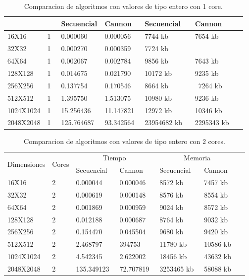 \documentclass[12pt]{article}
\begin{document}
\begin{titlepage}
\begin{table}[!htb]
\begin{tabular}{|l|l|l|l|l|l|l|}
    &  &Secuencial & Cannon & Secuencial & Cannon\\
    \hline
    16X16 & 1\ & 0.000060\ & 0.000056\ & 7744 kb\ & 7654 kb\ \\
    \hline
    32X32 & 1\ & 0.000270\ & 0.000359\ & 7724 kb\ & \ \\
    \hline
    64X64 & 1\ & 0.002067\ & 0.002784\ & 9856 kb\ & 7643 kb\ \\
    \hline
    128X128 & 1\ & 0.014675\ & 0.021790\ & 10172 kb\ & 9235 kb\ \\
    \hline
    256X256 & 1\ & 0.137754\ & 0.170546\ & 8664 kb\ & \ 7264 kb\\
    \hline
    512X512 & 1\ & 1.395750\ & 1.513075\ & 10980 kb\ & 9236 kb\ \\
    \hline
    1024X1024 & 1\ & 15.256436\ & 11.147821\ & 12972 kb\ & 10346 kb\ \\
    \hline
    2048X2048 & 1\ & 125.764687\ & 93.342564\ &23954682 kb \ & 2295343 kb\ \\
    \hline
  \end{tabular}
  \hfill
    \caption{Comparacion de algoritmos con valores de tipo entero con 1 core.}
\end{table}

\begin{table}[!htb]
\centering
  \begin{tabular}{|l|l|l|l|l|l|l|}
    \hline
    \multirow{2}{*}{Dimensiones} &
    \multirow{2}{*}{Cores} &
      \multicolumn{2}{c|}{Tiempo} &
      \multicolumn{2}{c|}{Memoria}\\
     
    &  &Secuencial & Cannon & Secuencial & Cannon\\
    \hline
    16X16 & 2\ & 0.000044\ & 0.000046\ & 8572 kb\ & 7457 kb\ \\
    \hline
    32X32 & 2\ & 0.000619\ & 0.000148\ & 8576 kb\ & 8554 kb\ \\
    \hline
    64X64 & 2\ & 0.001869\ & 0.000959\ & 9024 kb\ & 8572 kb\ \\
    \hline
    128X128 & 2\ & 0.012188\ & 0.000687\ & 8764 kb\ & 9032 kb\ \\
    \hline
    256X256 & 2\ & 0.154470\ & 0.045504\ & 9680 kb\ & 9420 kb\ \\
    \hline
    512X512 & 2\ & 2.468797\ & 394753\ & 11780 kb\ & 10586 kb\ \\
    \hline
    1024X1024 & 2\ & 4.542345\ & 2.622002\ & 18456 kb\ & 43632 kb\ \\
    \hline
    2048X2048 & 2\ & 135.349123\ & 72.707819\ & 3253465 kb\ & 58088 kb\ \\
    \hline
  \end{tabular}
  \hfill
    \caption{Comparacion de algoritmos con valores de tipo entero con 2 cores.}
\end{table}
\clearpage


\end{titlepage}
\end{document}
